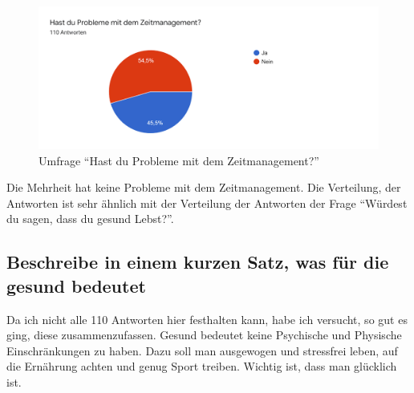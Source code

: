 \begin{figure}[H]
  \centering
  \includegraphics[width=0.7\linewidth]{./images/umfrage_g.png}
  \caption{Umfrage “Hast du Probleme mit dem Zeitmanagement?”}
  \label{fig:umfrage_g}
\end{figure}
Die Mehrheit hat keine Probleme mit dem Zeitmanagement. Die Verteilung, der Antworten ist sehr ähnlich mit der Verteilung der Antworten der Frage “Würdest du sagen, dass du gesund Lebst?”.
\subsection{Beschreibe in einem kurzen Satz, was für die gesund bedeutet}
\authortoc{\dario}{\subsectionident}
Da ich nicht alle 110 Antworten hier festhalten kann, habe ich versucht, so gut es ging, diese zusammenzufassen.
\newline
Gesund bedeutet keine Psychische und Physische Einschränkungen zu haben. Dazu soll man ausgewogen und stressfrei leben, auf die Ernährung achten und genug Sport treiben. Wichtig ist, dass man glücklich ist.